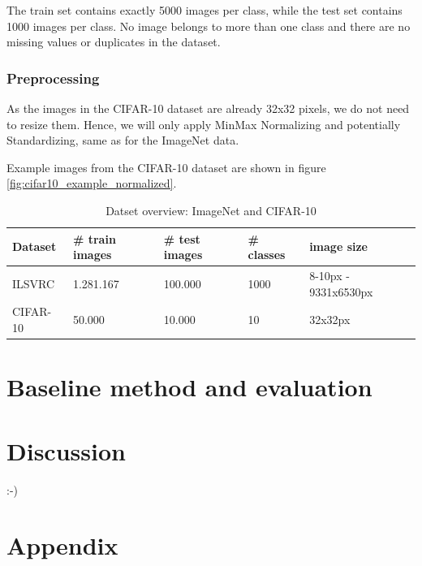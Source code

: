 \documentclass[10pt,a4paper,twoside]{article}
\begin{document}
    The train set contains exactly 5000 images per class, while the test set contains 1000 images per class. No image belongs to more than one class and there are no missing values or duplicates in the dataset.

    \subsubsection{Preprocessing}
    As the images in the CIFAR-10 dataset are already 32x32 pixels, we do not need to resize them. Hence, we will only apply MinMax Normalizing and potentially Standardizing, same as for the ImageNet data.

    Example images from the CIFAR-10 dataset are shown in figure \ref{fig:cifar10_example_normalized}.

    \begin{table}[]
        \begin{tabular}{lllll}
        Dataset & \# train images & \# test images & \# classes & image size \\ \hline \hline
          ILSVRC  & 1.281.167    &        100.000        &      1000       &    8-10px - 9331x6530px       \\
        CIFAR-10   &        50.000     &      10.000      &    10    &     32x32px       \\ \hline \hline
        \end{tabular}
        \caption{Datset overview: ImageNet and CIFAR-10}
        \label{tab:datasets}
    \end{table}

    \section{Baseline method and evaluation}\label{sec:baseline-method-and-evaluation}
    

\section{Discussion}
:-)



\section{Appendix}
\end{document}
